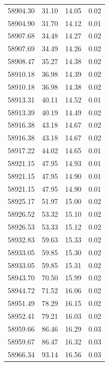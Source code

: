 \begin{longtable}{|c|c|c|c|}
 58904.30 &   31.10 &       14.05 &          0.02 \\
 58904.90 &   31.70 &       14.12 &          0.01 \\
 58907.68 &   34.48 &       14.27 &          0.02 \\
 58907.69 &   34.49 &       14.26 &          0.02 \\
 58908.47 &   35.27 &       14.38 &          0.02 \\
 58910.18 &   36.98 &       14.39 &          0.02 \\
 58910.18 &   36.98 &       14.38 &          0.02 \\
 58913.31 &   40.11 &       14.52 &          0.01 \\
 58913.39 &   40.19 &       14.49 &          0.02 \\
 58916.38 &   43.18 &       14.67 &          0.02 \\
 58916.38 &   43.18 &       14.67 &          0.02 \\
 58917.22 &   44.02 &       14.65 &          0.01 \\
 58921.15 &   47.95 &       14.93 &          0.01 \\
 58921.15 &   47.95 &       14.90 &          0.01 \\
 58921.15 &   47.95 &       14.90 &          0.01 \\
 58925.17 &   51.97 &       15.00 &          0.02 \\
 58926.52 &   53.32 &       15.10 &          0.02 \\
 58926.53 &   53.33 &       15.12 &          0.02 \\
 58932.83 &   59.63 &       15.33 &          0.02 \\
 58933.05 &   59.85 &       15.30 &          0.02 \\
 58933.05 &   59.85 &       15.31 &          0.02 \\
 58943.70 &   70.50 &       15.99 &          0.02 \\
 58944.72 &   71.52 &       16.06 &          0.02 \\
 58951.49 &   78.29 &       16.15 &          0.02 \\
 58952.41 &   79.21 &       16.03 &          0.02 \\
 58959.66 &   86.46 &       16.29 &          0.03 \\
 58959.67 &   86.47 &       16.32 &          0.03 \\
 58966.34 &   93.14 &       16.56 &          0.03 \\

\end{longtable}
